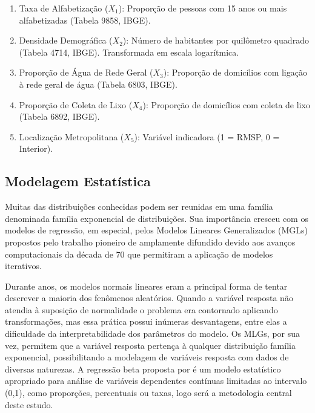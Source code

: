 \documentclass[12pt, a4paper]{article}
\begin{document}
\begin{enumerate}
    \item Taxa de Alfabetização ($X_1$): Proporção de pessoas com 15 anos ou mais alfabetizadas (Tabela 9858, IBGE).
    
    \item Densidade Demográfica ($X_2$): Número de habitantes por quilômetro quadrado (Tabela 4714, IBGE). Transformada em escala logarítmica.
    
    \item Proporção de Água de Rede Geral ($X_3$): Proporção de domicílios com ligação à rede geral de água (Tabela 6803, IBGE).
    
    \item Proporção de Coleta de Lixo ($X_4$): Proporção de domicílios com coleta de lixo (Tabela 6892, IBGE).
    
    \item Localização Metropolitana ($X_5$): Variável indicadora (1 = RMSP, 0 = Interior).
\end{enumerate}

\subsection{Modelagem Estatística}

Muitas das distribuições conhecidas podem ser reunidas em uma família denominada família exponencial de distribuições. Sua importância cresceu com os modelos de regressão, em especial, pelos Modelos Lineares Generalizados (MGLs) propostos pelo trabalho pioneiro de  amplamente difundido devido aos avanços computacionais da década de 70 que permitiram a aplicação de modelos iterativos.

Durante anos, os modelos normais lineares eram a principal forma de tentar descrever a maioria dos fenômenos aleatórios. Quando a variável resposta não atendia à suposição de normalidade o problema era contornado aplicando transformações, mas essa prática possui inúmeras desvantagens, entre elas a dificuldade da interpretabilidade dos parâmetros do modelo. Os MLGs, por sua vez, permitem que a variável resposta pertença à qualquer distribuição família exponencial, possibilitando a modelagem de variáveis resposta com dados de diversas naturezas. A regressão beta proposta por  é um modelo estatístico apropriado para análise de variáveis dependentes contínuas limitadas ao intervalo (0,1), como proporções, percentuais ou taxas, logo será a metodologia central deste estudo.
\end{document}
